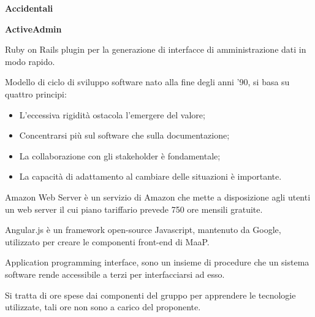 





\makeFrontPage



\clearpage
{}

\textbf{Accidentali}


\textbf{ActiveAdmin}

Ruby on Rails plugin per la generazione di interfacce di amministrazione dati in modo rapido. \\


Modello di ciclo di sviluppo software nato alla fine degli anni '90, si basa su quattro principi:
\begin{itemize}
\item L'eccessiva rigidità ostacola l'emergere del valore;
\item Concentrarsi più sul software che sulla documentazione;
\item La collaborazione con gli stakeholder è fondamentale;
\item La capacità di adattamento al cambiare delle situazioni è importante.
\end{itemize} 



Amazon Web Server è un servizio di Amazon che mette a disposizione agli utenti un web server il cui piano tariffario prevede 750 ore mensili gratuite. \\


Angular.js è un framework open-source Javascript, mantenuto da Google, utilizzato per creare le componenti front-end di MaaP. \\


Application programming interface, sono un insieme di procedure che un sistema software rende accessibile a terzi per interfacciarsi ad esso. \\


Si tratta di ore spese dai componenti del gruppo per apprendere le tecnologie utilizzate, tali ore non sono a carico del proponente. \\


